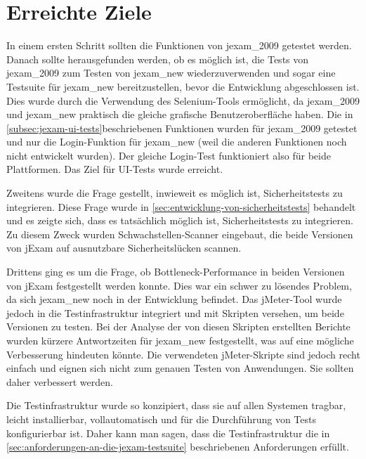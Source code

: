 \section{Erreichte Ziele}

In einem ersten Schritt sollten die Funktionen von \gls{jexam_2009}
getestet werden. Danach sollte herausgefunden werden, ob es möglich 
ist, die Tests von \gls{jexam_2009} zum Testen von \gls{jexam_new} 
wiederzuverwenden und sogar eine Testsuite für \gls{jexam_new} 
bereitzustellen, bevor die Entwicklung abgeschlossen ist. Dies wurde
durch die Verwendung des Selenium-Tools ermöglicht, da 
\gls{jexam_2009} und \gls{jexam_new} praktisch die gleiche grafische 
Benutzeroberfläche haben. Die in \autoref{subsec:jexam-ui-tests}beschriebenen
Funktionen wurden für \gls{jexam_2009} getestet und nur die Login-Funktion
für \gls{jexam_new} (weil die anderen Funktionen noch nicht entwickelt
wurden). Der gleiche Login-Test funktioniert also für beide
Plattformen. Das Ziel für UI-Tests wurde erreicht.

Zweitens wurde die Frage gestellt, inwieweit es möglich ist,
Sicherheitstests zu integrieren. Diese Frage wurde in
\autoref{sec:entwicklung-von-sicherheitstests} behandelt und es
zeigte sich, dass es tatsächlich möglich ist,
Sicherheitstests zu integrieren. Zu diesem Zweck wurden
Schwachstellen-Scanner eingebaut, die beide Versionen von jExam
auf ausnutzbare Sicherheitslücken scannen.


Drittens ging es um die Frage, ob Bottleneck-Performance in beiden
Versionen von jExam festgestellt werden konnte. Dies war ein schwer
zu lösendes Problem, da sich \gls{jexam_new} noch in der Entwicklung
befindet. Das jMeter-Tool wurde jedoch in die Testinfrastruktur
integriert und mit Skripten versehen, um beide Versionen zu testen.
Bei der Analyse der von diesen Skripten erstellten Berichte wurden
kürzere Antwortzeiten für \gls{jexam_new} festgestellt, was auf eine
mögliche Verbesserung hindeuten könnte. Die verwendeten jMeter-Skripte
sind jedoch recht einfach und eignen sich nicht zum genauen Testen
von Anwendungen. Sie sollten daher verbessert werden.


Die Testinfrastruktur wurde so konzipiert, dass sie auf allen
Systemen tragbar, leicht installierbar, vollautomatisch und für
die Durchführung von Tests konfigurierbar ist. Daher kann man
sagen, dass die Testinfrastruktur die in
\autoref{sec:anforderungen-an-die-jexam-testsuite} beschriebenen
Anforderungen erfüllt.




